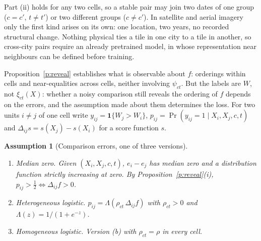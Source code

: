 \documentclass[11pt]{article}
\theoremstyle{tight}
\newtheorem{assumption}{Assumption}
\newcommand{\one}{\mathbf{1}}
\begin{document}
Part (ii) holds for any two cells, so a stable pair may join two dates of one group
($c=c'$, $t\neq t'$) or two different groups ($c\neq c'$). In satellite and aerial imagery only
the first kind arises on its own: one location, two years, no recorded structural change.
Nothing physical ties a tile in one city to a tile in another, so cross-city pairs require an
already pretrained model, in whose representation near neighbours can be defined before training.

Proposition~\ref{p:reveal} establishes what is observable about $f$: orderings within cells and
near-equalities across cells, neither involving $\psi_{ct}$. But the labels are $W$, not
$\xi_{ct}(X)$: whether a noisy comparison still reveals the ordering of $f$ depends on the
errors, and the assumption made about them determines the loss. For two units $i\neq j$
of one cell write $y_{ij}=\one\{W_j>W_i\}$, $p_{ij}=\Pr(y_{ij}=1\mid X_i,X_j,c,t)$ and
$\Delta_{ij}s=s(X_j)-s(X_i)$ for a score function $s$.

\begin{assumption}[Comparison errors, one of three versions]\label{a:err}\leavevmode
\begin{enumerate}[label=\textup{(\alph*)}]
\item \textup{Median zero.} Given $(X_i,X_j,c,t)$, $e_i-e_j$ has median zero and a distribution
      function strictly increasing at zero. By Proposition~\ref{p:reveal}\textup{(i)},
      $p_{ij}>\tfrac12\iff\Delta_{ij}f>0$.
\item \textup{Heterogeneous logistic.} $p_{ij}=\Lambda(\rho_{ct}\,\Delta_{ij}f)$ with
      $\rho_{ct}>0$ and $\Lambda(z)=1/(1+e^{-z})$.
\item \textup{Homogeneous logistic.} Version \textup{(b)} with $\rho_{ct}=\rho$ in every cell.
\end{enumerate}
\end{assumption}
\end{document}
